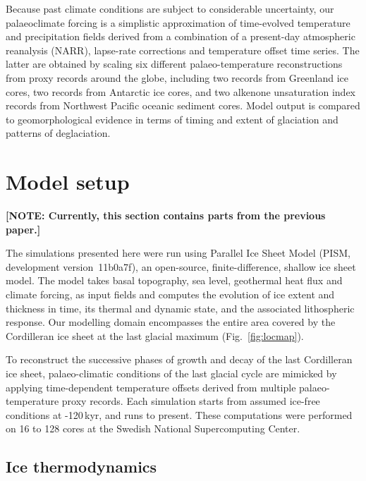 \documentclass[tc, ms]{copernicus}
\newcommand{\note}[1]{\textbf{[NOTE: #1]}}
\begin{document}
Because past climate conditions are subject to considerable uncertainty, our
palaeoclimate forcing is a simplistic approximation of time-evolved temperature
and precipitation fields derived from a combination of a present-day
atmospheric reanalysis (NARR), lapse-rate corrections and temperature offset
time series. The latter are
obtained by scaling six different palaeo-temperature reconstructions from
proxy records around the globe, including two  records from
Greenland ice cores, two  records from Antarctic ice cores,
and two alkenone unsaturation index records from Northwest Pacific oceanic
sediment cores. Model output is compared to geomorphological evidence in terms
of timing and extent of glaciation and patterns of deglaciation.


\section{Model setup}
\label{sec:model}

\note{Currently, this section contains parts from the previous paper.}

The simulations presented here were run using Parallel Ice Sheet Model (PISM,
development version~11b0a7f), an open-source, finite-difference, shallow ice
sheet model. The model takes basal topography, sea level, geothermal heat flux
and climate forcing, as input fields and computes the evolution of ice extent
and thickness in time, its thermal and dynamic state, and
the associated lithospheric response. Our modelling domain encompasses the
entire area covered by the Cordilleran ice sheet at the last glacial maximum
(Fig.~\ref{fig:locmap}).

To reconstruct the successive phases of growth and decay of the last Cordilleran
ice sheet, palaeo-climatic conditions of the last glacial cycle are mimicked
by applying time-dependent temperature offsets derived from multiple
palaeo-temperature proxy records. Each simulation starts from assumed ice-free
conditions at -120\,kyr, and runs to present. These computations were
performed on 16 to 128 cores at the Swedish National Supercomputing
Center.

\subsection{Ice thermodynamics}
\end{document}
